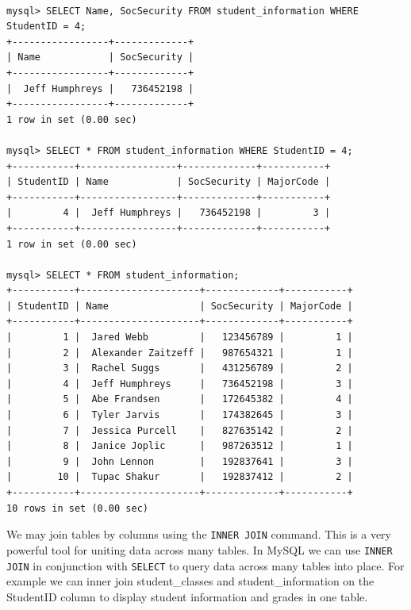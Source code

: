 \begin{lstlisting}

mysql> SELECT Name, SocSecurity FROM student_information WHERE StudentID = 4;
+-----------------+-------------+
| Name            | SocSecurity |
+-----------------+-------------+
|  Jeff Humphreys |   736452198 |
+-----------------+-------------+
1 row in set (0.00 sec)

mysql> SELECT * FROM student_information WHERE StudentID = 4;
+-----------+-----------------+-------------+-----------+
| StudentID | Name            | SocSecurity | MajorCode |
+-----------+-----------------+-------------+-----------+
|         4 |  Jeff Humphreys |   736452198 |         3 |
+-----------+-----------------+-------------+-----------+
1 row in set (0.00 sec)

mysql> SELECT * FROM student_information;
+-----------+---------------------+-------------+-----------+
| StudentID | Name                | SocSecurity | MajorCode |
+-----------+---------------------+-------------+-----------+
|         1 |  Jared Webb         |   123456789 |         1 |
|         2 |  Alexander Zaitzeff |   987654321 |         1 |
|         3 |  Rachel Suggs       |   431256789 |         2 |
|         4 |  Jeff Humphreys     |   736452198 |         3 |
|         5 |  Abe Frandsen       |   172645382 |         4 |
|         6 |  Tyler Jarvis       |   174382645 |         3 |
|         7 |  Jessica Purcell    |   827635142 |         2 |
|         8 |  Janice Joplic      |   987263512 |         1 |
|         9 |  John Lennon        |   192837641 |         3 |
|        10 |  Tupac Shakur       |   192837412 |         2 |
+-----------+---------------------+-------------+-----------+
10 rows in set (0.00 sec)

\end{lstlisting}

We may join tables by columns using the {\tt INNER JOIN} command.  This is a very powerful tool for uniting data across many tables.  In MySQL we can use {\tt INNER JOIN} in conjunction with {\tt SELECT} to query data across many tables into place.  For example we can inner join student\_classes and student\_information on the StudentID column to display student information and grades in one table.

